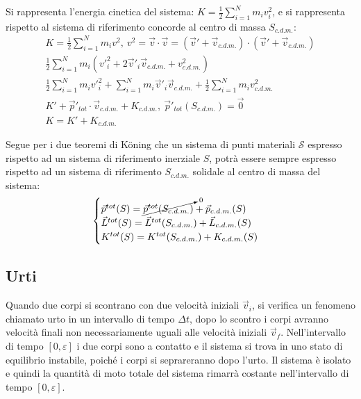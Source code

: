 \documentclass{article}
\numberwithin{equation}{subsection}
\begin{document}
Si rappresenta l'energia cinetica del sistema:
$K=\displaystyle\frac{1}{2}\sum_{i=1}^{N}m_iv_i^{2}$, e 
si rappresenta rispetto al sistema di riferimento concorde al 
centro di massa $S_{c.d.m.}$:
\begin{gather*}
    K=\displaystyle\frac{1}{2}\sum_{i=1}^{N}m_iv^{2},\:v^{2}=\vec{v}\cdot\vec{v}=(\vec{v}'+\vec{v}_{c.d.m.})\cdot(\vec{v}'+\vec{v}_{c.d.m.})\\
    \displaystyle\frac{1}{2}\sum_{i=1}^{N}m_i(v'^{2}_i+2\vec{v}'_i\vec{v}_{c.d.m.}+v_{c.d.m.}^{2})\\
    \displaystyle\frac{1}{2}\displaystyle\sum_{i=1}^{N}m_iv'^{2}_i+\displaystyle\sum_{i=1}^{N}m_i\vec{v}'_i\vec{v}_{c.d.m.}+\frac{1}{2}\displaystyle\sum_{i=1}^{N}m_iv_{c.d.m.}^{2}\\
    K'+\vec{p}'_{tot}\cdot\vec{v}_{c.d.m.}+K_{c.d.m.},\:\vec{p}'_{tot}(S_{c.d.m.})=\vec{0}\\
    K=K'+K_{c.d.m.}
\end{gather*}

Segue per i due teoremi di K\"oning che un sistema di punti materiali $\mathscr{S}$ espresso rispetto ad 
un sistema di riferimento inerziale $S$, potrà essere sempre espresso 
rispetto ad un sistema di riferimento $S_{c.d.m.}$ solidale al centro di massa del sistema:
\begin{equation}
    \begin{cases}
        \vec{p}^{tot}(S)=\cancelto{0}{\vec p^{tot}(S_{c.d.m.})}+\vec{p}_{c.d.m.}(S)\\
        \vec{L}^{tot}(S)=\vec{L}^{tot}(S_{c.d.m.})+\vec{L}_{c.d.m.}(S)\\
        K^{tot}(S)=K^{tot}(S_{c.d.m.})+K_{c.d.m.}(S)
    \end{cases}
\end{equation}

\subsection{Urti}
Quando due corpi si scontrano con due velocità iniziali $\vec{v}_i$, 
si verifica un fenomeno 
chiamato urto in un intervallo di tempo $\Delta t$, dopo 
lo scontro i corpi avranno velocità finali non necessariamente 
uguali alle velocità iniziali $\vec{v}_f$. Nell'intervallo di tempo 
$[0,\varepsilon]$ i due corpi sono a contatto e il sistema si trova 
in uno stato di equilibrio instabile, poiché i corpi si 
seprareranno dopo l'urto. Il sistema è isolato e quindi la 
quantità di moto totale del sistema rimarrà costante nell'intervallo 
di tempo $[0,\varepsilon]$. 
\end{document}
